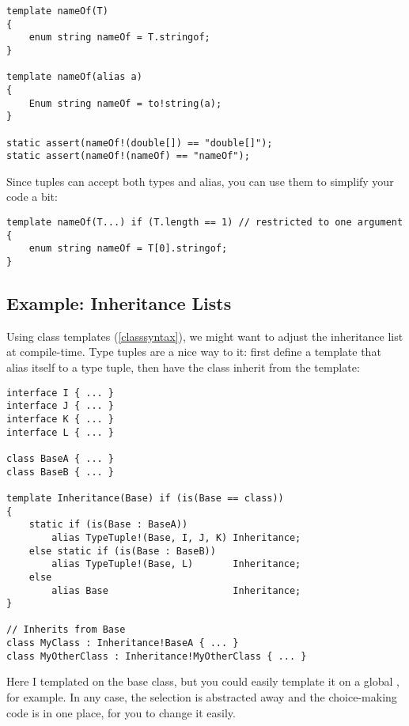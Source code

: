 \begin{verbatim}
template nameOf(T)
{
    enum string nameOf = T.stringof;
}

template nameOf(alias a)
{
    Enum string nameOf = to!string(a);
}

static assert(nameOf!(double[]) == "double[]");
static assert(nameOf!(nameOf) == "nameOf");
\end{verbatim}

Since tuples can accept both types and alias, you can use them to simplify your code a bit:

\begin{verbatim}
template nameOf(T...) if (T.length == 1) // restricted to one argument
{
    enum string nameOf = T[0].stringof;
}
\end{verbatim}


\subsection{Example: Inheritance Lists}\label{inheritancelist}


Using class templates (\ref{classsyntax}), we might want to adjust the inheritance list at compile-time. Type tuples are a nice way to it: first define a template that alias itself to a type tuple, then have the class inherit from the template:

\begin{verbatim}
interface I { ... }
interface J { ... }
interface K { ... }
interface L { ... }

class BaseA { ... }
class BaseB { ... }

template Inheritance(Base) if (is(Base == class))
{
    static if (is(Base : BaseA))
        alias TypeTuple!(Base, I, J, K) Inheritance;
    else static if (is(Base : BaseB))
        alias TypeTuple!(Base, L)       Inheritance;
    else
        alias Base                      Inheritance;
}

// Inherits from Base
class MyClass : Inheritance!BaseA { ... }
class MyOtherClass : Inheritance!MyOtherClass { ... }
\end{verbatim}

Here I templated  on the base class, but you could easily template it on a global , for example. In any case, the selection is abstracted away and the choice-making code is in one place, for you to change it easily.

